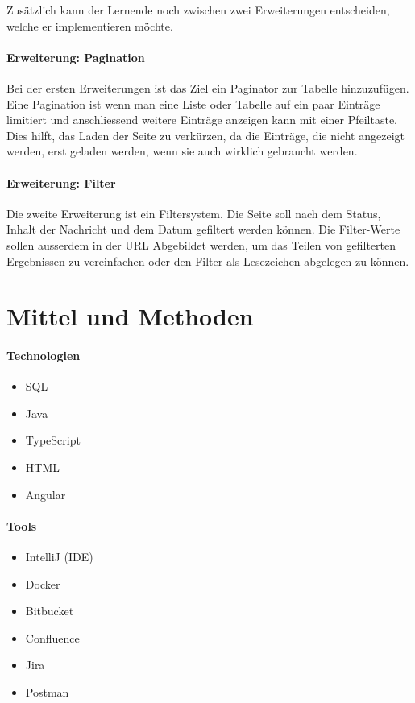 Zusätzlich kann der Lernende noch zwischen zwei Erweiterungen entscheiden, welche er implementieren möchte.

\paragraph{Erweiterung: Pagination}
Bei der ersten Erweiterungen ist das Ziel ein Paginator zur Tabelle hinzuzufügen. Eine Pagination ist wenn man eine Liste oder Tabelle auf ein paar Einträge limitiert und anschliessend weitere Einträge anzeigen kann mit einer Pfeiltaste. Dies hilft, das Laden der Seite zu verkürzen, da die Einträge, die nicht angezeigt werden, erst geladen werden, wenn sie auch wirklich gebraucht werden.

\paragraph{Erweiterung: Filter}
Die zweite Erweiterung ist ein Filtersystem. Die Seite soll nach dem Status, Inhalt der Nachricht und dem Datum gefiltert werden können. Die Filter-Werte sollen ausserdem in der URL Abgebildet werden, um das Teilen von gefilterten Ergebnissen zu vereinfachen oder den Filter als Lesezeichen abgelegen zu können.

\section{Mittel und Methoden}\label{sec:mittel-und-methoden}

\paragraph{Technologien}
\begin{itemize}
	\item SQL
    \item Java
    \item TypeScript
    \item HTML
    \item Angular
\end{itemize}

\paragraph{Tools}
\begin{itemize}
	\item IntelliJ (IDE)
    \item Docker
	\item Bitbucket
	\item Confluence
	\item Jira
	\item Postman
\end{itemize}

